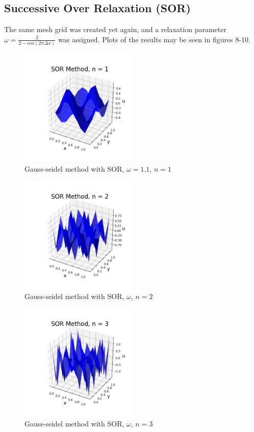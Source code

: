\documentclass[12pt,a4paper]{report}
\begin{document}
		\subsection{Successive Over Relaxation (SOR)}
			The same mesh grid was created yet again, and a relaxation parameter
			$\omega=\frac{2}{2 - cos{\left(2\pi \Delta x\right)}}$ was assigned.  Plots of the results may be seen in figures 8-10.

			\begin{figure}[h]
				\centering
					\includegraphics[width=0.5\textwidth]{sorn1.png}
					\caption{Gauss-seidel method with SOR, $\omega=1.1$, $n=1$}
			\end{figure} 

			\begin{figure}[h]
				\centering
					\includegraphics[width=0.5\textwidth]{sorn2.png}
					\caption{Gauss-seidel method with SOR, $\omega$, $n=2$}
			\end{figure} 

			\begin{figure}[h]
				\centering
					\includegraphics[width=0.5\textwidth]{sorn3.png}
					\caption{Gauss-seidel method with SOR, $\omega$, $n=3$}
			\end{figure}
			
\end{document}
